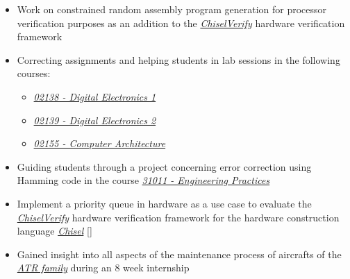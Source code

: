 \documentclass[10pt,a4paper,ragged2e,withhyper]{altacv}
\newcommand{\course}[2]{\href{https://kurser.dtu.dk/course/#1}{\textit{#1 - #2}}}
\newcommand{\link}[2]{\href{#1}{\textit{#2}}}
\begin{document}
\begin{paracol}{2}


\begin{itemize}
\item Work on constrained random assembly program generation for processor verification purposes as an addition to the \link{https://github.com/chiselverify/chiselverify}{ChiselVerify} hardware verification framework
\end{itemize}

\divider

\begin{itemize}
    \item Correcting assignments and helping students in lab sessions in the following courses:
    \begin{itemize}
        \item \course{02138}{Digital Electronics 1}
        \item \course{02139}{Digital Electronics 2}
        \item \course{02155}{Computer Architecture}
    \end{itemize}
    \item Guiding students through a project concerning error correction using Hamming code in the course \course{31011}{Engineering Practices}
\end{itemize} 

\divider

\begin{itemize}
\item Implement a priority queue in hardware as a use case to evaluate the \link{https://github.com/chiselverify/chiselverify}{ChiselVerify} hardware verification framework for the hardware construction language \link{https://www.chisel-lang.org/}{Chisel} [\cite{chiselverify}]
\end{itemize}

\divider

\begin{itemize}
    \item Gained insight into all aspects of the maintenance process of aircrafts of the \link{https://en.wikipedia.org/wiki/ATR_(aircraft_manufacturer)}{ATR family} during an 8 week internship
\end{itemize}






\end{paracol}
\end{document}
